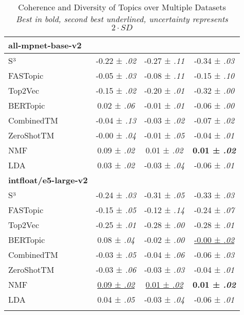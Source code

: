 \begin{table*}[p]
{\begin{tabular}{lccc}
\midrule
\textbf{all-mpnet-base-v2} & & &\\
\midrule
S³ & -0.22 ± \textit{.02} & -0.27 ± \textit{.11} & -0.34 ± \textit{.03}\\
FASTopic & -0.05 ± \textit{.03} & -0.08 ± \textit{.11} & -0.15 ± \textit{.10}\\
Top2Vec & -0.15 ± \textit{.02} & -0.20 ± \textit{.01} & -0.32 ± \textit{.00}\\
BERTopic & 0.02 ± \textit{.06} & -0.01 ± \textit{.01} & -0.06 ± \textit{.00}\\
CombinedTM & -0.04 ± \textit{.13} & -0.03 ± \textit{.02} & -0.07 ± \textit{.02}\\
ZeroShotTM & -0.00 ± \textit{.04} & -0.01 ± \textit{.05} & -0.04 ± \textit{.01}\\
NMF & 0.09 ± \textit{.02} & 0.01 ± \textit{.02} & \textbf{0.01 ± \textit{.02}}\\
LDA & 0.03 ± \textit{.02} & -0.03 ± \textit{.04} & -0.06 ± \textit{.01}\\
\midrule
\textbf{intfloat/e5-large-v2} & & &\\
\midrule
S³ & -0.24 ± \textit{.03} & -0.31 ± \textit{.05} & -0.33 ± \textit{.03}\\
FASTopic & -0.15 ± \textit{.05} & -0.12 ± \textit{.14} & -0.24 ± \textit{.07}\\
Top2Vec & -0.25 ± \textit{.01} & -0.28 ± \textit{.00} & -0.28 ± \textit{.01}\\
BERTopic & 0.08 ± \textit{.04} & -0.02 ± \textit{.00} & \underline{-0.00 ± \textit{.02}}\\
CombinedTM & -0.03 ± \textit{.05} & -0.04 ± \textit{.06} & -0.06 ± \textit{.03}\\
ZeroShotTM & -0.03 ± \textit{.06} & -0.03 ± \textit{.03} & -0.04 ± \textit{.01}\\
NMF & \underline{0.09 ± \textit{.02}} & \underline{0.01 ± \textit{.02}} & \textbf{0.01 ± \textit{.02}}\\
LDA & 0.04 ± \textit{.05} & -0.03 ± \textit{.04} & -0.06 ± \textit{.01}\\
\bottomrule
\label{table:evaluation}
\end{tabular}
}
\egroup
\caption{ Coherence and Diversity of Topics over Multiple Datasets \\
\textit{Best in bold, second best underlined, uncertainty represents $2 \cdot SD$}
}
\end{table*}